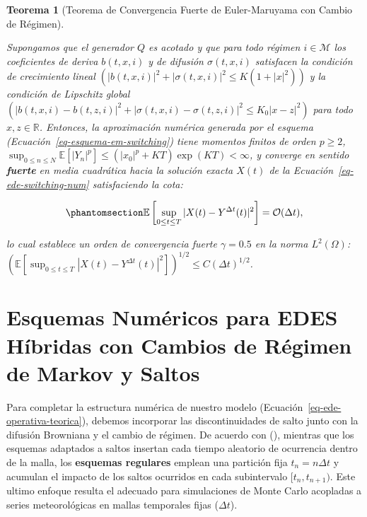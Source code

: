 \documentclass[
  spanish,
  us-letterpaper,
]{scrreprt}
\numberwithin{equation}{section}
\theoremstyle{plain}
\newtheorem{theorem}{Teorema}[chapter]
\theoremstyle{plain}
\theoremstyle{definition}
\theoremstyle{plain}
\theoremstyle{remark}
\begin{document}
\begin{theorem}[Teorema de Convergencia Fuerte de Euler-Maruyama con
Cambio de
Régimen]\protect\hypertarget{thm-em-switching}{}\label{thm-em-switching}

Supongamos que el generador \(Q\) es acotado y que para todo régimen
\(i \in \mathcal{M}\) los coeficientes de deriva \(b(t, x, i)\) y de
difusión \(\sigma(t, x, i)\) satisfacen la condición de crecimiento
lineal
\(\left( |b(t, x, i)|^2 + |\sigma(t, x, i)|^2 \le K(1 + |x|^2)\right)\)
y la condición de Lipschitz global
\(\left( |b(t, x, i) - b(t, z, i)|^2 + |\sigma(t, x, i) - \sigma(t, z, i)|^2 \le K_0|x - z|^2 \right)\)
para todo \(x, z \in \mathbb{R}\). Entonces, la aproximación numérica
generada por el esquema (Ecuación~\ref{eq-esquema-em-switching}) tiene
momentos finitos de orden \(p \ge 2\),
\(\displaystyle \sup_{0 \le n \le N} \mathbb{E}[|Y_n|^p] \le (|x_0|^p + KT)\exp(KT) < \infty\),
y converge en sentido \textbf{fuerte} en media cuadrática hacia la
solución exacta \(X(t)\) de la Ecuación~\ref{eq-ede-switching-num}
satisfaciendo la cota:

\begin{equation}\phantomsection\label{eq-cota-fuerte-switching}{
\mathbb{E}\left[ \sup_{0 \le t \le T} \vert X(t) - Y^{\Delta t}(t) \vert^2 \right] = \mathcal{O}(\Delta t),
}\end{equation}

lo cual establece un orden de convergencia fuerte \(\gamma = 0.5\) en la
norma \(\displaystyle L^2(\Omega)\):
\(\displaystyle \left(\mathbb{E}[\sup_{0 \le t \le T} |X(t) - Y^{\Delta t}(t)|^2]\right)^{1/2} \le C(\Delta t)^{1/2}\).

\end{theorem}

\section{Esquemas Numéricos para EDES Híbridas con Cambios de Régimen de
Markov y Saltos}\label{sec-numerico-saltos}

Para completar la estructura numérica de nuestro modelo
(Ecuación~\ref{eq-ede-operativa-teorica}), debemos incorporar las
discontinuidades de salto junto con la difusión Browniana y el cambio de
régimen. De acuerdo con (), mientras que los esquemas adaptados a saltos
insertan cada tiempo aleatorio de ocurrencia dentro de la malla, los
\textbf{esquemas regulares} emplean una partición fija
\(t_n = n\Delta t\) y acumulan el impacto de los saltos ocurridos en
cada subintervalo \([t_n, t_{n+1})\). Este ultimo enfoque resulta el
adecuado para simulaciones de Monte Carlo acopladas a series
meteorológicas en mallas temporales fijas (\(\Delta t\)).
\end{document}
